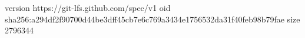 version https://git-lfs.github.com/spec/v1
oid sha256:a294df2f90700d44be3dff45cb7e6c769a3434e1756532da31f40feb98b79fae
size 2796344
